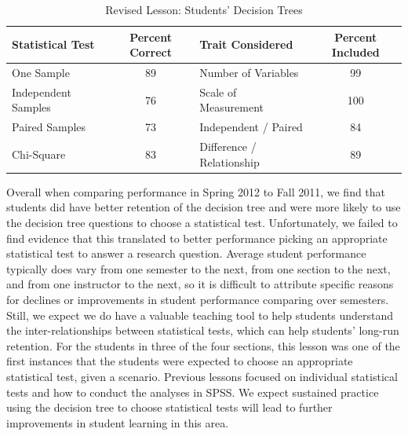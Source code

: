 \documentclass[12pt]{article}
\begin{document}
\begin{table}\caption{Revised Lesson: Students' Decision Trees}\label{tb:spring_trees}\vspace*{1pc}
\begin{tabular}{l|c||l|c}
Statistical Test & Percent Correct & Trait Considered & Percent Included \\ \hline
One Sample & 89 & Number of Variables & 99 \\
Independent Samples & 76 & Scale of Measurement & 100 \\
Paired Samples & 73 & Independent / Paired & 84 \\
Chi-Square & 83 & Difference / Relationship & 89 \\ \hline
\end{tabular}
\end{table}

Overall when comparing performance in Spring 2012 to Fall 2011, we find that students did have better retention of the decision tree and were more likely to use the decision tree questions to choose a statistical test.  Unfortunately, we failed to find evidence that this translated to better performance picking an appropriate statistical test to answer a research question.  Average student performance typically does vary from one semester to the next, from one section to the next, and from one instructor to the next, so it is difficult to attribute specific reasons for declines or improvements in student performance comparing over semesters.  Still, we expect we do have a valuable teaching tool to help students understand the inter-relationships between statistical tests, which can help students' long-run retention.  For the students in three of the four sections, this lesson was one of the first instances that the students were expected to choose an appropriate statistical test, given a scenario.  Previous lessons focused on individual statistical tests and how to conduct the analyses in SPSS.  We expect sustained practice using the decision tree to choose statistical tests will lead to further improvements in student learning in this area.
\end{document}
